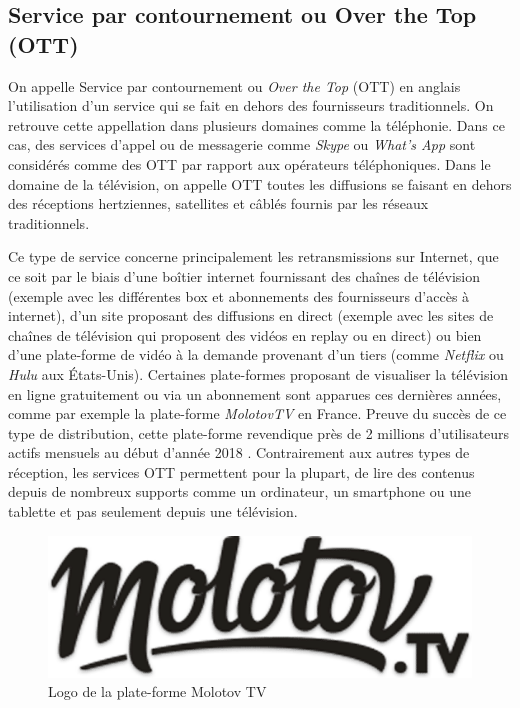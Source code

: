 \documentclass{polytech/polytech}
\begin{document}
\subsection{Service par contournement ou Over the Top (OTT)}
\label{subsec:ott}


On appelle Service par contournement ou \textit{Over the Top} (OTT) en anglais l'utilisation d'un service qui se fait en dehors des fournisseurs traditionnels. On retrouve cette appellation dans plusieurs domaines comme la téléphonie. Dans ce cas, des services d'appel ou de messagerie comme \textit{Skype} ou \textit{What's App} sont considérés comme des OTT par rapport aux opérateurs téléphoniques. Dans le domaine de la télévision, on appelle OTT toutes les diffusions se faisant en dehors des réceptions hertziennes, satellites et câblés fournis par les réseaux traditionnels. 

Ce type de service concerne principalement les retransmissions sur Internet, que ce soit par le biais d'une boîtier internet fournissant des chaînes de télévision (exemple avec les différentes box et abonnements des fournisseurs d'accès à internet), d'un site proposant des diffusions en direct (exemple avec les sites de chaînes de télévision qui proposent des vidéos en replay ou en direct) ou bien d'une plate-forme de vidéo à la demande provenant d'un tiers (comme \textit{Netflix} ou \textit{Hulu} aux \'{E}tats-Unis). Certaines plate-formes proposant de visualiser la télévision en ligne gratuitement ou via un abonnement sont apparues ces dernières années, comme par exemple la plate-forme \textit{MolotovTV} en France. Preuve du succès de ce type de distribution, cette plate-forme revendique près de 2 millions d'utilisateurs actifs mensuels au début d'année 2018 \cite{_molotov_2018}. Contrairement aux autres types de réception, les services OTT permettent pour la plupart, de lire des contenus depuis de nombreux supports comme un ordinateur, un smartphone ou une tablette et pas seulement depuis une télévision.


\begin{figure}
	\includegraphics[scale=0.4]{images/logoMolotov}
	\caption{Logo de la plate-forme Molotov TV}
	\label{fig:logoMolotov}
\end{figure}
\end{document}

